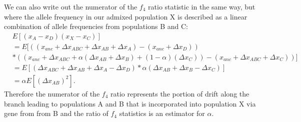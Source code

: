 \documentclass[12pt]{report}
\begin{document}
We can also write out the numerator of the $f_4$ ratio statistic in the same way, but where the allele frequency in our admixed population X is described as a linear combination of allele frequencies from populations B and C:
\begin{align*}
&E[(x_A - x_D)(x_X - x_C)] \\
&= E[((x_{anc} + \Delta{x_{ABC}} + \Delta{x_{AB}} + \Delta{x_{A}}) - (x_{anc} + \Delta{x_{D}})) \\
&*((x_{anc} + \Delta{x_{ABC}} + \alpha(\Delta{x_{AB}} + \Delta{x_B}) + (1 - \alpha)(\Delta{x_C})) - (x_{anc} + \Delta{x_{ABC}} + \Delta{x_C}))] \\
&=E[(\Delta{x_{ABC}} + \Delta{x_{AB}} + \Delta{x_{A}} - \Delta{x_{D}})*\alpha(\Delta{x_{AB}} + \Delta{x_B} - \Delta{x_C})]\\
&=\alpha E[(\Delta{x_{AB}})^2].
\end{align*}
Therefore the numerator of the $f_4$ ratio represents the portion of drift along the branch leading to populations A and B that is incorporated into population X via gene from from B and the ratio of $f_4$ statistics is an estimator for $\alpha$.
\end{document}
